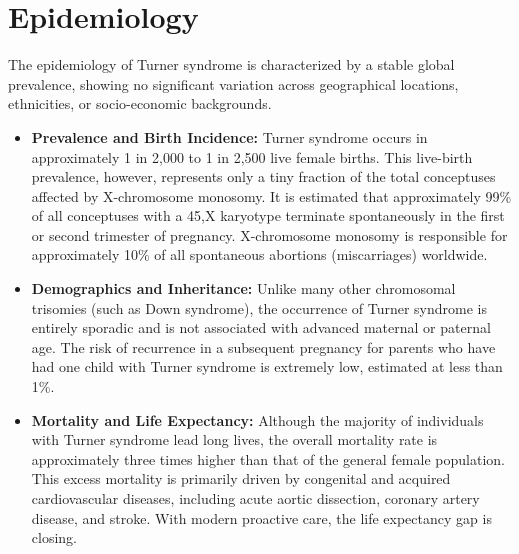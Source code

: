 \section*{Epidemiology}
The epidemiology of Turner syndrome is characterized by a stable global prevalence, showing no significant variation across geographical locations, ethnicities, or socio-economic backgrounds.
\begin{itemize}
    \item \textbf{Prevalence and Birth Incidence:} Turner syndrome occurs in approximately 1 in 2,000 to 1 in 2,500 live female births. This live-birth prevalence, however, represents only a tiny fraction of the total conceptuses affected by X-chromosome monosomy. It is estimated that approximately 99\% of all conceptuses with a 45,X karyotype terminate spontaneously in the first or second trimester of pregnancy. X-chromosome monosomy is responsible for approximately 10\% of all spontaneous abortions (miscarriages) worldwide.
    \item \textbf{Demographics and Inheritance:} Unlike many other chromosomal trisomies (such as Down syndrome), the occurrence of Turner syndrome is entirely sporadic and is not associated with advanced maternal or paternal age. The risk of recurrence in a subsequent pregnancy for parents who have had one child with Turner syndrome is extremely low, estimated at less than 1\%.
    \item \textbf{Mortality and Life Expectancy:} Although the majority of individuals with Turner syndrome lead long lives, the overall mortality rate is approximately three times higher than that of the general female population. This excess mortality is primarily driven by congenital and acquired cardiovascular diseases, including acute aortic dissection, coronary artery disease, and stroke. With modern proactive care, the life expectancy gap is closing.
\end{itemize}

